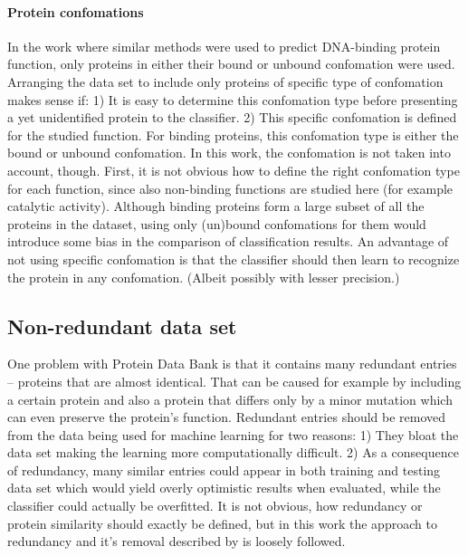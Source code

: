 \documentclass[11pt,twoside,a4paper]{book}
\begin{document}
\paragraph{Protein confomations}
In the work \cite{szabova} where similar methods were used to predict DNA-binding protein 
function, only proteins in either their bound or unbound confomation were used.
Arranging the data set to include only proteins of specific type of
confomation makes sense if: 1) It is easy to determine this confomation type 
before presenting a yet unidentified protein to the classifier. 
2) This specific confomation is defined for the studied function.
For binding proteins, this confomation type is either the bound
or unbound confomation.
In this work, the confomation is not taken into account, though.
First, it is not obvious how to define the right confomation
type for each function, since also non-binding functions
are studied here (for example catalytic activity).
Although binding proteins form a large subset of all the proteins
in the dataset, using only (un)bound confomations  for them  would introduce
some bias in the comparison of classification results.
An advantage of not using specific confomation is that 
the classifier should then learn to recognize 
the protein in any confomation.
(Albeit possibly with lesser precision.) 

\subsection{Non-redundant data set}
\label{ssec:redundancy}
One problem with Protein Data Bank is that it contains many redundant entries --
proteins that are almost identical.
That can be caused for example by 
including a certain protein and also a protein that differs 
only by a minor mutation which can even preserve the protein's function.
Redundant entries should be removed from the data being used for machine learning for two reasons:
1) They bloat the data set making the learning more computationally difficult.
2) As a consequence of redundancy, many similar entries could appear in both training and testing data set
which would yield overly optimistic results when evaluated, 
while the classifier could actually be overfitted.
It is not obvious, how redundancy or protein similarity should exactly be defined,
but in this work the approach to redundancy and it's removal described by \cite{maxind} is loosely followed.
\end{document}
